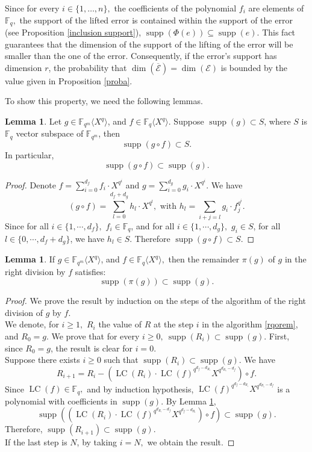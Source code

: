 \documentclass{article}
\newcommand{\Fq}{\mathbb{F}_q}
\newcommand{\Fqm}{\mathbb{F}_{q^m}}
\newcommand{\QP}{\mathbb{F}_{q^m} \langle X^q \rangle}
\newcommand{\supp}{\operatorname{supp}}
\newcommand{\LC}{\operatorname{LC}}
\theoremstyle{definition}
\newtheorem{lemma}[theorem]{Lemma}
\begin{document}
\noindent Since for every $i \in \{1, \dots, n\},$ the coefficients of the polynomial $f_i$ are elements of $\Fq,$ the support of the lifted error is contained within the support of the error (see Proposition \ref{inclusion support}), $\operatorname{supp}(\Phi(e)) \subseteq \operatorname{supp}(e)$. This fact guarantees that the dimension of the support of the lifting of the error will be smaller than the one of the error. Consequently, if the error's support has dimension $r$, the probability that $\dim \left( \overline{\mathcal{E}}
      \right) = \dim (\mathcal{E})$ is bounded by the value given in Proposition \ref{proba}.

\noindent To show this property, we need the following lemmas.

\begin{lemma} \label{compo fq}
      Let $g \in \QP$, and $f\in \Fq\langle X^q \rangle.$ Suppose $\supp(g) \subset S$,  where $S$ is  $\Fq$ vector subspace of $\Fqm$,  then \[\supp(g \circ f) \subset S.\]
      In particular,  \[\supp(g \circ f) \subset \supp(g).\]
\end{lemma}

\begin{proof}
      Denote $\displaystyle f = \sum_{i=0}^{d_f} f_i \cdot X^{q^i}$ and $\displaystyle g = \sum_{i=0}^{d_g} g_i \cdot X^{q^i}. $
      We have \[(g \circ f) = \underset{l = 0}{\overset{d_f + d_g}{\sum}} h_l \cdot X^{q^l},\text{ with }h_l = \underset{i + j = l}{\sum} g_i \cdot
            f_j^{q^i}.\] Since for all $ i \in \{ 1, \cdots, d_f\}, $ $f_i \in \Fq$, and for all  $ i \in \{ 1, \cdots, d_g\}, $ $g_i \in S$, for all $l \in \{0, \cdots, d_f + d_g\}$, we have $h_l \in S.$ Therefore $\supp(g \circ f) \subset S$.
\end{proof}

\begin{lemma}\label{reste}
      If $g \in \QP$, and $f\in \Fq\langle X^q \rangle,$ then the remainder $\pi(g)$ of $g$ in the right division by $f$ satisfies: \[ \supp(\pi(g)) \subset \supp(g).\]
\end{lemma}
\begin{proof}
      We prove the result by induction on the steps of the algorithm of the right division of $g$ by $f.$ \\
      We denote, for $i\geq 1,$ $R_i$ the value of $R$ at the step $i$ in the algorithm \ref{rqorem}, and $R_0=g.$ We prove that for every $i \geq 0,~ \supp(R_i) \subset \supp(g)$.
      First, since $R_0=g$, the result is clear for $i = 0.$ \\
      Suppose there exists $i \geq 0$ such that $\supp(R_i) \subset \supp (g). $
      We have \[R_{i+1} = R_i-(\LC(R_i)\cdot  \LC(f)^{q^{d_f-d_{R_i}}}X^{q^{d_{R_i}-d_f}})\circ f. \]
      Since $\LC(f) \in \Fq,$ and by induction hypothesis,  $\LC(f)^{q^{d_f-d_{R_i}}}X^{q^{d_{R_i}-d_f}}$ is a polynomial with coefficients in $\supp(g).$
      By Lemma \ref{compo fq}, \[\supp((\LC(R_i)\cdot  \LC(f)^{q^{d_{R_i}-d_f}}X^{q^{d_f-d_{R_i}}})\circ f) \subset \supp(g).\] Therefore, $\supp(R_{i+1}) \subset \supp(g).$ \\
      If the last step is $N$, by taking $i=N,$ we obtain the result.
\end{proof}
\end{document}
